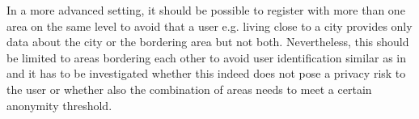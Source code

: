 In a more advanced setting, it should be possible to register with more than one area on the same level to avoid that a user e.g. living close to a city provides only data about the city or the bordering area but not both. Nevertheless, this should be limited to areas bordering each other to avoid user identification similar as in \parencite{privacy-home-work-pairs} and it has to be investigated whether this indeed does not pose a privacy risk to the user or whether also the combination of areas needs to meet a certain anonymity threshold.
